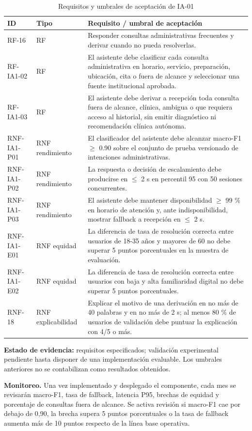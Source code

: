 \documentclass[11pt,a4paper]{article}
\begin{document}
\begin{longtable}{p{2.5cm}p{3.4cm}p{9.8cm}}
	\caption{Requisitos y umbrales de aceptación de IA-01}\\\toprule\textbf{ID}&\textbf{Tipo}&\textbf{Requisito / umbral de aceptación}\\\midrule\endhead
	RF-16&RF&Responder consultas administrativas frecuentes y derivar cuando no pueda resolverlas.\\
	RF-IA1-02 & RF & El asistente debe clasificar cada consulta administrativa en horario, servicio, preparación, ubicación, cita o fuera de alcance y seleccionar una fuente institucional aprobada. \\
	RF-IA1-03 & RF & El asistente debe derivar a recepción toda consulta fuera de alcance, clínica, ambigua o que requiera acceso al historial, sin emitir diagnóstico ni recomendación clínica autónoma. \\
	RNF-IA1-P01 & RNF rendimiento & El clasificador del asistente debe alcanzar macro-F1 $\geq$ 0.90 sobre el conjunto de prueba versionado de intenciones administrativas. \\
	RNF-IA1-P02 & RNF rendimiento & La respuesta o decisión de escalamiento debe producirse en $\leq$ 2 s en percentil 95 con 50 sesiones concurrentes. \\
	RNF-IA1-P03 & RNF rendimiento & El asistente debe mantener disponibilidad $\geq$ 99 \% en horario de atención y, ante indisponibilidad, mostrar fallback a recepción en $\leq$ 2 s. \\
	RNF-IA1-E01 & RNF equidad & La diferencia de tasa de resolución correcta entre usuarios de 18-35 años y mayores de 60 no debe superar 5 puntos porcentuales en la muestra de evaluación. \\
	RNF-IA1-E02 & RNF equidad & La diferencia de tasa de resolución correcta entre usuarios con baja y alta familiaridad digital no debe superar 5 puntos porcentuales. \\
	RNF-18&RNF explicabilidad&Explicar el motivo de una derivación en no más de 40 palabras y en no más de 2 s; al menos 80 \% de usuarios de validación debe puntuar la explicación con 4/5 o más.\\\bottomrule\end{longtable}

\textbf{Estado de evidencia:} requisitos especificados; validación experimental pendiente hasta disponer de una implementación evaluable. Los umbrales anteriores no se contabilizan como resultados obtenidos.

\textbf{Monitoreo.} Una vez implementado y desplegado el componente, cada mes se revisarán macro-F1, tasa de fallback, latencia P95, brechas de equidad y porcentaje de consultas fuera de alcance. Se activa revisión si macro-F1 cae por debajo de 0,90, la brecha supera 5 puntos porcentuales o la tasa de fallback aumenta más de 10 puntos respecto de la línea base operativa.
\end{document}
